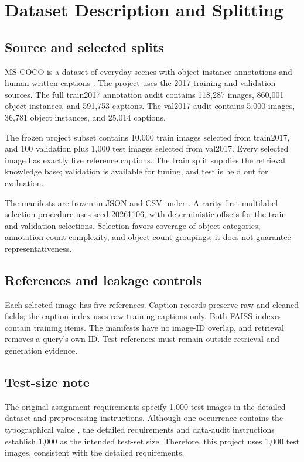 \section{Dataset Description and Splitting}
\label{ch:dataset}

\subsection{Source and selected splits}
MS COCO is a dataset of everyday scenes with object-instance annotations and human-written captions \citep{lin2014coco,cocodocs}. The project uses the 2017 training and validation sources. The full train2017 annotation audit contains 118,287 images, 860,001 object instances, and 591,753 captions. The val2017 audit contains 5,000 images, 36,781 object instances, and 25,014 captions.

The frozen project subset contains 10,000 train images selected from train2017, and 100 validation plus 1,000 test images selected from val2017. Every selected image has exactly five reference captions. The train split supplies the retrieval knowledge base; validation is available for tuning, and test is held out for evaluation.



The manifests are frozen in JSON and CSV under . A rarity-first multilabel selection procedure uses seed 20261106, with deterministic offsets for the train and validation selections. Selection favors coverage of object categories, annotation-count complexity, and object-count groupings; it does not guarantee representativeness.

\subsection{References and leakage controls}
Each selected image has five references. Caption records preserve raw and cleaned fields; the caption index uses raw training captions only. Both FAISS indexes contain training items. The manifests have no image-ID overlap, and retrieval removes a query's own ID. Test references must remain outside retrieval and generation evidence.

\subsection{Test-size note}
The original assignment requirements specify 1,000 test images in the detailed dataset and preprocessing instructions. Although one occurrence contains the typographical value , the detailed requirements and data-audit instructions establish 1,000 as the intended test-set size. Therefore, this project uses 1,000 test images, consistent with the detailed requirements.
